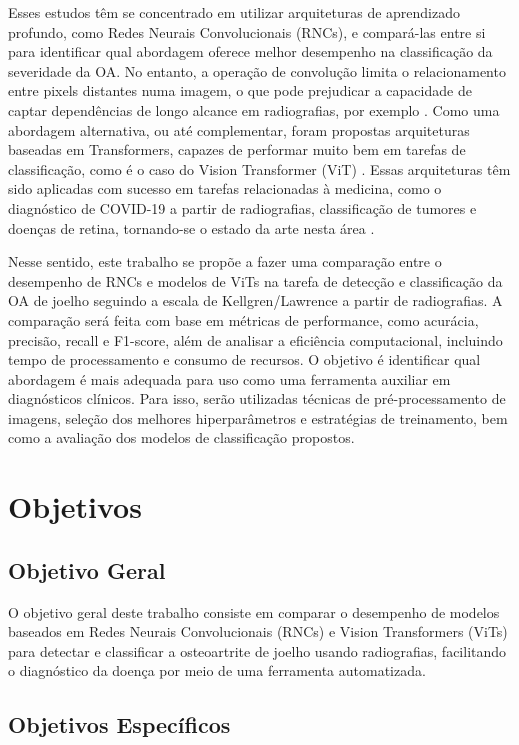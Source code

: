 Esses estudos têm se concentrado em utilizar arquiteturas de aprendizado profundo, como Redes Neurais Convolucionais (RNCs), e compará-las entre si para identificar qual abordagem oferece melhor desempenho na classificação da severidade da OA. No entanto, a operação de convolução limita o relacionamento entre pixels distantes numa imagem, o que pode prejudicar a capacidade de captar dependências de longo alcance em radiografias, por exemplo \cite{Shamshad2023}. Como uma abordagem alternativa, ou até complementar, foram propostas arquiteturas baseadas em Transformers, capazes de performar muito bem em tarefas de classificação, como é o caso do Vision Transformer (ViT) \cite{Dosovitskiy2021}. Essas arquiteturas têm sido aplicadas com sucesso em tarefas relacionadas à medicina, como o diagnóstico de COVID-19 a partir de radiografias, classificação de tumores e doenças de retina, tornando-se o estado da arte nesta área \cite{Shamshad2023}.

Nesse sentido, este trabalho se propõe a fazer uma comparação entre o desempenho de RNCs e modelos de ViTs na tarefa de detecção e classificação da OA de joelho seguindo a escala de Kellgren/Lawrence a partir de radiografias. A comparação será feita com base em métricas de performance, como acurácia, precisão, recall e F1-score, além de analisar a eficiência computacional, incluindo tempo de processamento e consumo de recursos. O objetivo é identificar qual abordagem é mais adequada para uso como uma ferramenta auxiliar em diagnósticos clínicos. Para isso, serão utilizadas técnicas de pré-processamento de imagens, seleção dos melhores hiperparâmetros e estratégias de treinamento, bem como a avaliação dos modelos de classificação propostos.

\section{Objetivos}

\subsection{Objetivo Geral}

O objetivo geral deste trabalho consiste em comparar o desempenho de modelos baseados em Redes Neurais Convolucionais (RNCs) e Vision Transformers (ViTs) para detectar e classificar a osteoartrite de joelho usando radiografias, facilitando o diagnóstico da doença por meio de uma ferramenta automatizada.

\subsection{Objetivos Específicos}

